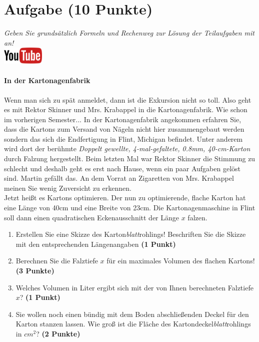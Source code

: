 \documentclass[a4paper, 10pt]{scrartcl}\usepackage[]{graphicx}\usepackage[]{xcolor}
\begin{document}
 
\clearpage

\section{Aufgabe \hfill (10 Punkte)}

\textit{Geben Sie grunds{\"a}tzlich Formeln und Rechenweg zur L{\"o}sung der
  Teilaufgaben mit an!} \\[1Ex]

\hfill\href{https://youtu.be/RuzMjwvwT-4}{\includegraphics[width =
  2cm]{img/youtube}} %
\hspace{2Ex}

\paragraph{In der Kartonagenfabrik}



Wenn man sich zu sp{\"a}t anmeldet, dann ist die Exkursion nicht so toll. Also
geht es mit Rektor Skinner und Mrs. Krabappel in die Kartonagenfabrik. Wie
schon im vorherigen Semester... In der Kartonagenfabrik angekommen erfahren
Sie, dass die Kartons zum Versand von N{\"a}geln nicht hier zusammengebaut
werden sondern das sich die Endfertigung in Flint, Michigan befindet. Unter
anderem wird dort der ber{\"u}hmte \textit{Doppelt gewellte,
  4-mal-gefaltete, 0.8mm, 40-cm-Karton} durch
Falzung hergestellt. Beim letzten Mal war Rektor Skinner die Stimmung zu
schlecht und deshalb geht es erst nach Hause, wenn ein paar Aufgaben gel{\"o}st
sind. Martin gef{\"a}llt das. An dem Vorrat
an Zigaretten von Mrs. Krabappel meinen Sie wenig Zuversicht zu erkennen.\\

Jetzt hei{\ss}t es Kartons optimieren. Der nun zu optimierende, flache Karton
hat eine L{\"a}nge von 40cm und eine Breite von 23cm. Die
Kartonagenmaschine in Flint soll dann einen quadratischen Eckenausschnitt
der L{\"a}nge $x$ falzen.

\begin{enumerate}
\item Erstellen Sie eine Skizze des Karton\textit{blatt}rohlings!
  Beschriften Sie die Skizze mit den entsprechenden L{\"a}ngenangaben
  \textbf{(1 Punkt)}
\item Berechnen Sie die Falztiefe $x$ f{\"u}r ein maximales Volumen des flachen
  Kartons! \textbf{(3 Punkte)}
\item Welches Volumen in Liter ergibt sich mit der von Ihnen berechneten
  Falztiefe $x$?  \textbf{(1 Punkt)}
\item Sie wollen noch einen b{\"u}ndig mit dem Boden abschlie{\ss}enden Deckel f{\"u}r
  den Karton stanzen lassen. Wie gro{\ss} ist die Fl{\"a}che des
  Kartondeckel\textit{blatt}rohlings in $cm^2$? \textbf{(2 Punkte)}
\end{enumerate}
\end{document}
